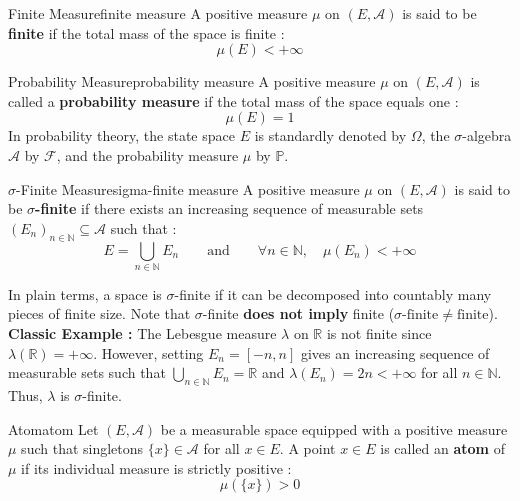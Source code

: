 \begin{definition}{Finite Measure}{finite measure}
A positive measure $\mu$ on $(E, \mathcal{A})$ is said to be \textbf{finite} if the total mass of the space is finite :
\[
    \mu(E) < +\infty
\]
\end{definition}

\begin{definition}{Probability Measure}{probability measure}
A positive measure $\mu$ on $(E, \mathcal{A})$ is called a \textbf{probability measure} if the total mass of the space equals one :
\[
    \mu(E) = 1
\]
In probability theory, the state space $E$ is standardly denoted by $\Omega$, the $\sigma$-algebra $\mathcal{A}$ by $\mathcal{F}$, and the probability measure $\mu$ by $\mathbb{P}$.
\end{definition}

\begin{definition}{$\sigma$-Finite Measure}{sigma-finite measure}
A positive measure $\mu$ on $(E, \mathcal{A})$ is said to be \textbf{$\sigma$-finite} if there exists an increasing sequence of measurable sets $(E_n)_{n \in \mathbb{N}} \subseteq \mathcal{A}$ such that :
\[
    E = \bigcup_{n \in \mathbb{N}} E_n \qquad \text{and} \qquad \forall n \in \mathbb{N}, \quad \mu(E_n) < +\infty
\]
\end{definition}

\begin{insight}
In plain terms, a space is $\sigma$-finite if it can be decomposed into countably many pieces of finite size. Note that $\sigma$-finite \textbf{does not imply} finite ($\sigma\text{-finite} \neq \text{finite}$).
\newline
\\
\textbf{Classic Example :} The Lebesgue measure $\lambda$ on $\mathbb{R}$ is not finite since $\lambda(\mathbb{R}) = +\infty$. However, setting $E_n = [-n, n]$ gives an increasing sequence of measurable sets such that $\bigcup_{n \in \mathbb{N}} E_n = \mathbb{R}$ and $\lambda(E_n) = 2n < +\infty$ for all $n \in \mathbb{N}$. Thus, $\lambda$ is $\sigma$-finite.
\end{insight}


\begin{definition}{Atom}{atom}
Let $(E, \mathcal{A})$ be a measurable space equipped with a positive measure $\mu$ such that singletons $\{x\} \in \mathcal{A}$ for all $x \in E$. A point $x \in E$ is called an \textbf{atom} of $\mu$ if its individual measure is strictly positive :
\[
    \mu(\{x\}) > 0
\]
\end{definition}

